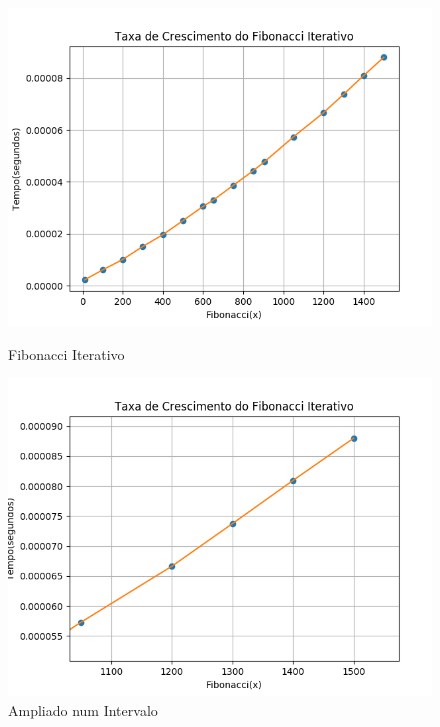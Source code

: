 \documentclass[a4paper, 12pt]{article}
\begin{document}
\begin{figure}[h]
\centering
\begin{minipage}[b]{0.45\linewidth}
\includegraphics[width=\linewidth]{../fibonacci_iterativo.png}
\caption{Fibonacci Iterativo}
\end{minipage}
\hfill
\begin{minipage}[b]{0.45\linewidth}
\includegraphics[width=\linewidth]{../fibonacci_iterativo_zoom.png}
\caption{Ampliado num Intervalo}
\end{minipage}
\end{figure} 
\newpage
\end{document}
